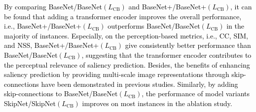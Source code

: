 \documentclass{article}
\begin{document}
\textcolor{black}{
By comparing BaseNet/BaseNet$(L_{\text{CB}})$ and BaseNet+/BaseNet+$(L_{\text{CB}})$, it can be found that adding a transformer encoder improves the overall performance, i.e., BaseNet+/BaseNet+$(L_{\text{CB}})$ outperforms BaseNet/BaseNet$(L_{\text{CB}})$ in the majority of instances. 
Especially, on the perception-based metrics, i.e., CC, SIM, and NSS, BaseNet+/BaseNet+$(L_{\text{CB}})$ give consistently better performance than BaseNet/BaseNet$(L_{\text{CB}})$, suggesting that the transformer encoder contributes to the perceptual relevance of saliency prediction.
Besides, the benefits of enhancing saliency prediction by providing multi-scale image representations through skip-connections have been demonstrated in previous studies.
Similarly, by adding skip-connections to BaseNet/BaseNet$(L_{\text{CB}})$, the performance of model variants SkipNet/SkipNet$(L_{\text{CB}})$ improves on most instances in the ablation study. 
}
\end{document}
